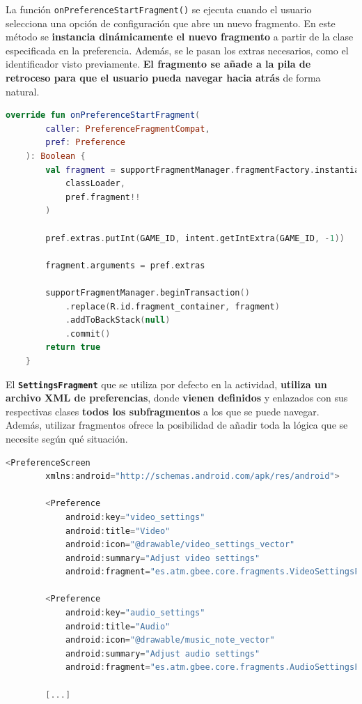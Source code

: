 La función \texttt{onPreferenceStartFragment()} se ejecuta cuando el usuario selecciona una opción de configuración que abre un nuevo fragmento. En este método se \textbf{instancia dinámicamente el nuevo fragmento} a partir de la clase especificada en la preferencia. Además, se le pasan los extras necesarios, como el identificador visto previamente. \textbf{El fragmento se añade a la pila de retroceso para que el usuario pueda navegar hacia atrás} de forma natural.

\begin{lstlisting}[language=Kotlin, caption={SettingsActivity - Selección de Otro Fragmento.}, label={code:settingsActivitySelect}]
    override fun onPreferenceStartFragment(
        caller: PreferenceFragmentCompat,
        pref: Preference
    ): Boolean {
        val fragment = supportFragmentManager.fragmentFactory.instantiate(
            classLoader,
            pref.fragment!!
        )

        pref.extras.putInt(GAME_ID, intent.getIntExtra(GAME_ID, -1))

        fragment.arguments = pref.extras

        supportFragmentManager.beginTransaction()
            .replace(R.id.fragment_container, fragment)
            .addToBackStack(null)
            .commit()
        return true
    }
\end{lstlisting}

El \textbf{\texttt{SettingsFragment}} que se utiliza por defecto en la actividad, \textbf{utiliza un archivo XML de preferencias}, donde \textbf{vienen definidos} y enlazados con sus respectivas clases \textbf{todos los subfragmentos} a los que se puede navegar. Además, utilizar fragmentos ofrece la posibilidad de añadir toda la lógica que se necesite según qué situación.

\begin{lstlisting}[language=Kotlin, caption={SettingsActivity - Archivo de Preferencias.}, label={code:settingsActivityPreferences}]
    <PreferenceScreen
        xmlns:android="http://schemas.android.com/apk/res/android">

        <Preference
            android:key="video_settings"
            android:title="Video"
            android:icon="@drawable/video_settings_vector"
            android:summary="Adjust video settings"
            android:fragment="es.atm.gbee.core.fragments.VideoSettingsFragment" />

        <Preference
            android:key="audio_settings"
            android:title="Audio"
            android:icon="@drawable/music_note_vector"
            android:summary="Adjust audio settings"
            android:fragment="es.atm.gbee.core.fragments.AudioSettingsFragment" />

        [...]
\end{lstlisting}

